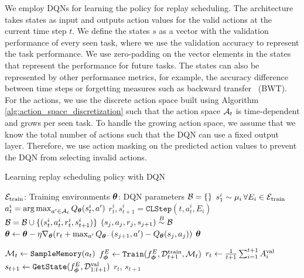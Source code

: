We employ DQNs for learning the policy for replay scheduling. The architecture takes states as input and outputs action values for the valid actions at the current time step $t$. We define the states $s$ as a vector with the validation performance of every seen task, where we use the validation accuracy to represent the task performance. We use zero-padding on the vector elements in the states that represent the performance for future tasks. The states can also be represented by other performance metrics, for example, the accuracy difference between time steps or forgetting measures such as backward transfer~\cite{lopez2017gradient} (BWT). For the actions, we use the discrete action space built using Algorithm \ref{alg:action_space_discretization} such that the action space ${\mathcal{A}}_t$ is time-dependent and grows per seen task. To handle the growing action space, we assume that we know the total number of actions such that the DQN can use a fixed output layer. Therefore, we use action masking on the predicted action values to prevent the DQN from selecting invalid actions. 

\begin{algorithm}[t]
	\caption{Learning replay scheduling policy with DQN}
	\label{alg:learning_replay_scheduling_policy_with_dqn}
	\begin{algorithmic}[1]
		\Require ${\mathcal{E}}_{{\text{train}}}$: Training environments
		\Require ${\bm{\theta}}$: DQN parameters
		\State ${\mathcal{B}} = \{\}$ 
		\State $s_1^{i} \sim \mu_i \, \forall E_i \in {\mathcal{E}}_{{\text{train}}}$ 
		\State $a_t^{i} = \operatorname*{arg\,max}_{a' \in {\mathcal{A}}_t} Q_{{\bm{\theta}}}(s_t^{i}, a')$ 
		\State $r_t^{i}, s_{t+1}^{i} = \texttt{CLStep}(t, a_t^{i}, E_i)$
		\State ${\mathcal{B}} = {\mathcal{B}} \cup \{(s_{t}^{i}, a_{t}^{i}, r_{t}^{i}, s_{t+1}^{i})\}$ 
		\State $(s_j, a_j, r_j, s_{j+1}) \stackrel{B}{\sim} {\mathcal{B}}$ 					
		\State ${\bm{\theta}} \leftarrow {\bm{\theta}} - \eta \nabla_{{\bm{\theta}}} (r_t + \max_{a'} Q_{{\bm{\theta}}^{-}}(s_{j+1}, a') - Q_{{\bm{\theta}}}(s_j, a_j))$ 
		\EndFor
		\EndFor 
		\EndFor
		\State \Return ${\bm{\theta}}$ 
		
		\Statex
		
		\State ${\mathcal{M}}_t \leftarrow \texttt{SampleMemory}(a_t)$ 
		\State $f_{{\bm{\phi}}}^{E} \leftarrow \texttt{Train}(f_{{\bm{\phi}}}^{E}, {\mathcal{D}}_{t+1}^{{\text{train}}}, {\mathcal{M}}_t)$ 
		\State $r_t \leftarrow \frac{1}{t+1} \sum_{i=1}^{t+1} A_{i}^{{\text{val}}}$ 
		\State $s_{t+1} \leftarrow \texttt{GetState}(f_{{\bm{\phi}}}^{E}, {\mathcal{D}}_{1:t+1}^{{\text{val}}})$ 
		\State \Return $r_t$, $s_{t+1}$ 
		\EndFunction
	\end{algorithmic}
\end{algorithm}

